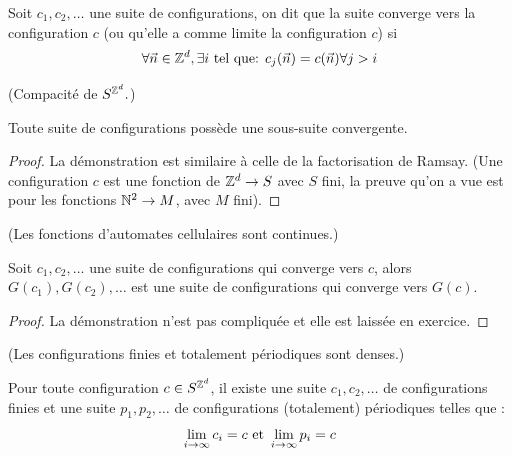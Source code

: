 \begin{definition}
	Soit $c_1,c_2, \ldots$ une suite de configurations, on dit que la suite converge vers
	la configuration $c$ (ou qu'elle a comme limite la configuration $c$) si
	$$ \forall \vec n \in \mathbb{Z}^d, \exists i \mbox{ tel que: } c_j(\vec n) = c(\vec n) \forall j > i$$
\end{definition}

\begin{prop}\label{prop:compact}(Compacité de $S^{\mathbb{Z}^d}.$)

	Toute suite de configurations possède une sous-suite convergente.
\end{prop}

\begin{proof}
	La démonstration est similaire à celle de la factorisation de Ramsay.
	(Une configuration $c $ est une fonction de $\mathbb{Z}^d \to S$ avec $S$ fini, la preuve qu'on a vue est pour les fonctions $\mathbb{N} ^ 2 \to M$, avec $M$ fini).
\end{proof}

\begin{prop}\label{prop:continues}(Les fonctions d'automates cellulaires sont continues.)

	Soit $c_1,c_2, \ldots$ une suite de configurations qui converge vers $c$,
	alors $G(c_1),G(c_2), \ldots$ est une suite de configurations qui converge vers $G(c)$.
\end{prop}

\begin{proof}
	La démonstration n'est pas compliquée et elle est laissée en exercice.
\end{proof}

\begin{prop}\label{prop:dense} (Les configurations finies et totalement périodiques sont denses.)

	Pour toute configuration $c \in S^{\mathbb{Z}^d}$, il existe une suite $c_1,c_2, \ldots$ de configurations finies et une suite  $p_1,p_2, \ldots$
	de configurations (totalement) périodiques telles que :
	$$ \lim_{i \to \infty} c_i = c \text{ et } \lim_{i \to \infty} p_i = c $$
\end{prop}

